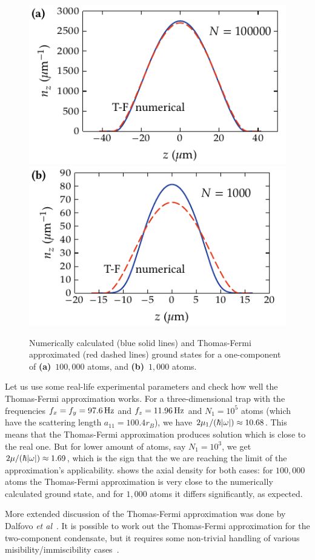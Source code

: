 \begin{figure}
\centerline{%
	\includegraphics{figures_generated/mean_field/one_comp_gs_large.pdf}%
	\includegraphics{figures_generated/mean_field/one_comp_gs_small.pdf}}
\caption{Numerically calculated (blue solid lines) and Thomas-Fermi approximated (red dashed lines) ground states for a one-component \Rb{}  of \textbf{(a)}~$100,000$ atoms, and \textbf{(b)}~$1,000$ atoms.}%
\label{fig:bec-noise:mean-field:tf-vs-accurate}
\end{figure}

Let us use some real-life experimental parameters and check how well the Thomas-Fermi approximation works.
For a three-dimensional trap with the frequencies $f_x = f_y = 97.6\mbox{\ensuremath{\,\mathrm{Hz}}}$ and $f_z = 11.96\mbox{\ensuremath{\,\mathrm{Hz}}}$ and $N_1=10^5$ \Rb{} atoms (which have the scattering length $a_{11} = 100.4 r_B$), we have $2 \mu_1 / (\hbar |\mathbf{\omega}|) \approx 10.68$.
This means that the Thomas-Fermi approximation produces solution which is close to the real one.
But for lower amount of atoms, say $N_1=10^3$, we get $2 \mu / (\hbar |\mathbf{\omega}|) \approx 1.69$, which is the sign that the we are reaching the limit of the approximation's applicability.
 shows the axial density for both cases: for $100,000$ atoms the Thomas-Fermi approximation is very close to the numerically calculated ground state, and for $1,000$ atoms it differs significantly, as expected.

More extended discussion of the Thomas-Fermi approximation was done by Dalfovo \textit{et al}~\cite{Dalfovo1999}.
It is possible to work out the Thomas-Fermi approximation for the two-component condensate, but it requires some non-trivial handling of various misibility/immiscibility cases~\cite{Anderson2010}.
